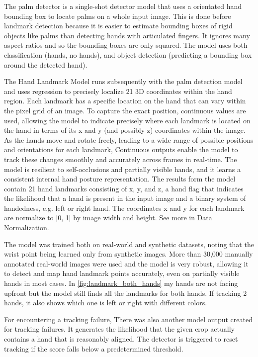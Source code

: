 The palm detector is a single-shot detector model  that uses a orientated hand bounding box to locate palms on a whole input image. This is done before landmark detection because it is easier to estimate bounding boxes of rigid objects like palms than detecting hands with articulated fingers. It ignores many aspect ratios and so the bounding boxes are only squared. The model uses both classification (hands, no hands), and object detection (predicting a bounding box around the detected hand). 


The Hand Landmark Model runs subsequently with the palm detection model and uses regression to precisely localize 21 3D coordinates within the hand region. Each landmark has a specific location on the hand that can vary within the pixel grid of an image. To capture the exact position, continuous values are used, allowing the model to indicate precisely where each landmark is located on the hand in terms of its x and y (and possibly z) coordinates within the image. As the hands move and rotate freely, leading to a wide range of possible positions and orientations for each landmark,  Continuous outputs enable the model to track these changes smoothly and accurately across frames in real-time.
The model is resilient to self-occlusions and partially visible hands, and it learns a consistent internal hand posture representation. The results form the model contain 21 hand landmarks consisting of x, y, and z, a hand flag that indicates the likelihood that a hand is present in the input image and a binary system of handedness, e.g. left or right hand. 
The coordinates x and y for each landmark are normalize to [0, 1] by image width and height. See more in Data Normalization.

The model was trained both on real-world and synthetic datasets, noting that the wrist point being learned only from synthetic images. More than 30,000 manually annotated real-world images were used and the model is very robust, allowing it to detect and map hand landmark points accurately, even on partially visible hands in most cases. In 
\ref{fig:landmark_both_hands} my hands are not facing upfront but the model still finds all the landmarks for both hands. If tracking 2 hands, it also shows which one is left or right with different colors.

For encountering a tracking failure, There was also another model output created for tracking failures. It generates the likelihood that the given crop actually contains a hand that is reasonably aligned. The detector is triggered to reset tracking if the score falls below a predetermined threshold. 

